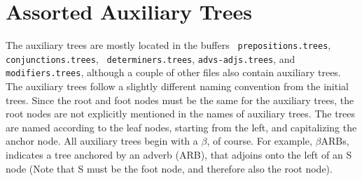 \section{Assorted Auxiliary Trees}

The auxiliary trees are mostly located in the buffers {\tt
prepositions.trees}, {\tt conjunctions.trees}, {\tt
determiners.trees}, {\tt advs-adjs.trees}, and {\tt modifiers.trees},
although a couple of other files also contain auxiliary trees.  The
auxiliary trees follow a slightly different naming convention from the
initial trees.  Since the root and foot nodes must be the same for the
auxiliary trees, the root nodes are not explicitly mentioned in the
names of auxiliary trees.  The trees are named according to the leaf
nodes, starting from the left, and capitalizing the anchor node.  All
auxiliary trees begin with a $\beta$, of course.  For example,
$\beta$ARBs, indicates a tree anchored by an adverb (ARB), that
adjoins onto the left of an S node (Note that S must be the foot node,
and therefore also the root node).

